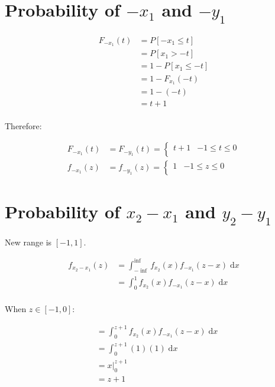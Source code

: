 \documentclass{article}
\newcommand{\dx}{{\; \mathrm{d}x}}
\begin{document}
\section{Probability of $-x_1$ and $-y_1$}

\begin{align*}
F_{-x_1}(t)
&= P \left[ -x_1 \leq t \right] \\
&= P \left[ x_1 > -t \right] \\
&= 1 - P \left[ x_1 \leq -t \right] \\
&= 1 - F_{x_1}(-t) \\
&= 1 - (-t) \\
&= t + 1 \\
\end{align*}

Therefore:

\begin{align*}
F_{-x_1}(t) &= F_{-y_1}(t) =
\begin{cases}
    t + 1 & -1 \leq t \leq 0 \\
\end{cases}
\\
f_{-x_1}(z) &= f_{-y_1}(z) =
\begin{cases}
    1 & -1 \leq z \leq 0 \\
\end{cases}
\end{align*}

\section{Probability of $x_2 - x_1$ and $y_2 - y_1$}

New range is $[-1, 1]$.

\begin{align*}
f_{x_2 - x_1}(z)
&= \int_{-\inf}^{\inf} f_{x_2}(x)f_{-x_1}(z - x) \dx \\
&= \int_{0}^{1} f_{x_2}(x)f_{-x_1}(z - x) \dx \\
\end{align*}

When $z \in [-1, 0]$:

\begin{align*}
&= \int_{0}^{z + 1} f_{x_2}(x)f_{-x_1}(z - x) \dx \\
&= \int_{0}^{z + 1} (1)(1) \dx \\
&= x \Big|_{0}^{z + 1} \\
&= z + 1 \\
\end{align*}
\end{document}
